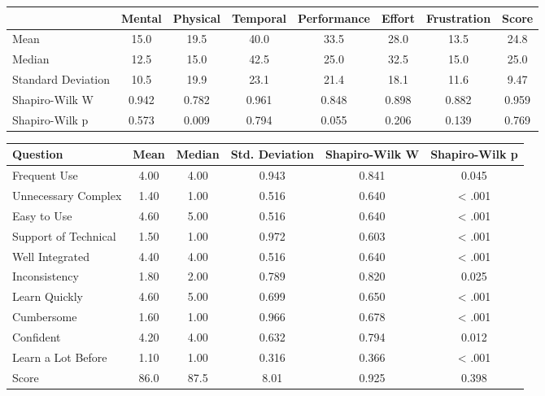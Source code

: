\begin{center}
    \begin{minipage}{\textwidth}
      
    \centering
    \begin{tabular}{l|c|c|c|c|c|c|c}
        \toprule
        & \textbf{Mental} & \textbf{Physical} & \textbf{Temporal} & \textbf{Performance} & \textbf{Effort} & \textbf{Frustration} & \textbf{Score} \\
        \midrule
        Mean & 15.0 & 19.5 & 40.0 & 33.5 & 28.0 & 13.5 & 24.8 \\
        Median & 12.5 & 15.0 & 42.5 & 25.0 & 32.5 & 15.0 & 25.0 \\
        Standard Deviation & 10.5 & 19.9 & 23.1 & 21.4 & 18.1 & 11.6 & 9.47 \\
        Shapiro-Wilk W & 0.942 & 0.782 & 0.961 & 0.848 & 0.898 & 0.882 & 0.959 \\
        Shapiro-Wilk p & 0.573 & 0.009 & 0.794 & 0.055 & 0.206 & 0.139 & 0.769 \\
        \bottomrule
    \end{tabular}  

    \vspace{\baselineskip}

    \begin{tabular}{l|c|c|c|c|c}
        \toprule
        \textbf{Question} & \textbf{Mean} & \textbf{Median} & \textbf{Std. Deviation} & \textbf{Shapiro-Wilk W} & \textbf{Shapiro-Wilk p} \\
        \midrule
        Frequent Use & 4.00 & 4.00 & 0.943 & 0.841 & 0.045 \\
        Unnecessary Complex & 1.40 & 1.00 & 0.516 & 0.640 & < .001 \\
        Easy to Use & 4.60 & 5.00 & 0.516 & 0.640 & < .001 \\
        Support of Technical & 1.50 & 1.00 & 0.972 & 0.603 & < .001 \\
        Well Integrated & 4.40 & 4.00 & 0.516 & 0.640 & < .001 \\
        Inconsistency & 1.80 & 2.00 & 0.789 & 0.820 & 0.025 \\
        Learn Quickly & 4.60 & 5.00 & 0.699 & 0.650 & < .001 \\
        Cumbersome & 1.60 & 1.00 & 0.966 & 0.678 & < .001 \\
        Confident & 4.20 & 4.00 & 0.632 & 0.794 & 0.012 \\
        Learn a Lot Before & 1.10 & 1.00 & 0.316 & 0.366 & < .001 \\
        Score & 86.0 & 87.5 & 8.01 & 0.925 & 0.398 \\
        \bottomrule
    \end{tabular}

    \end{minipage}
\end{center}



